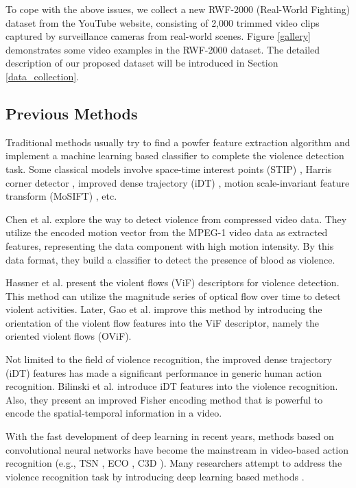 \documentclass[a4paper,conference]{IEEEtran}
\begin{document}
To cope with the above issues, we collect a new RWF-2000 (Real-World Fighting) dataset from the YouTube website, consisting of 2,000 trimmed video clips captured by surveillance cameras from real-world scenes. Figure \ref{gallery} demonstrates some video examples in the RWF-2000 dataset. The detailed description of our proposed dataset will be introduced in Section \ref{data_collection}.  

\subsection{Previous Methods}
Traditional methods usually try to find a powfer feature extraction algorithm and implement a machine learning based classifier to complete the violence detection task. Some classical models involve space-time interest points (STIP) \cite{r8}, Harris corner detector \cite{d1}, improved dense trajectory (iDT) \cite{r11}, motion scale-invariant feature transform (MoSIFT) \cite{MoSIFT}, etc.

Chen et al. \cite{r6} explore the way to detect violence from compressed video data. They utilize the encoded motion vector from the MPEG-1 video data as extracted features, representing the data component with high motion intensity. By this data format, they build a classifier to detect the presence of blood as violence.

Hassner et al. \cite{r3} present the violent flows (ViF) descriptors for violence detection. This method can utilize the magnitude series of optical flow over time to detect violent activities. Later, Gao et al. \cite{d2} improve this method by introducing the orientation of the violent flow features into the ViF descriptor, namely the oriented violent flows (OViF).

Not limited to the field of violence recognition, the improved dense trajectory (iDT) \cite{r11} features has made a significant performance in generic human action recognition. Bilinski et al. \cite{d3} introduce iDT features into the violence recognition. Also, they present an improved Fisher encoding method that is powerful to encode the spatial-temporal information in a video.

With the fast development of deep learning in recent years, methods based on convolutional neural networks have become the mainstream in video-based action recognition (e.g., TSN \cite{r4}, ECO \cite{r2}, C3D \cite{r1}). Many researchers attempt to address the violence recognition task by introducing deep learning based methods \cite{d4, zhou2017violent, d5,d6, convlstm-violence}.
\end{document}

